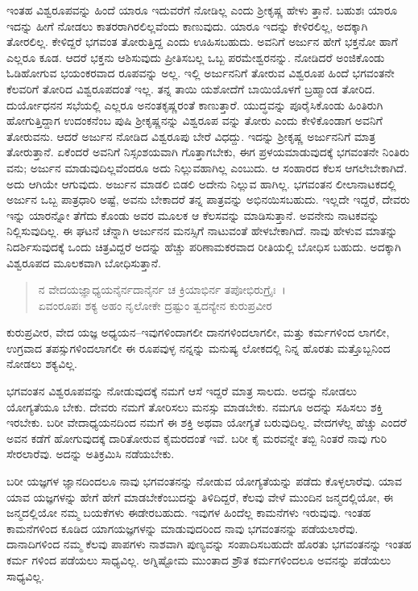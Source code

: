 ಇಂತಹ ವಿಶ್ವರೂಪವನ್ನು ಹಿಂದೆ ಯಾರೂ ಇದುವರೆಗೆ ನೋಡಿಲ್ಲ ಎಂದು ಶ‍್ರೀಕೃಷ್ಣ ಹೇಳು ತ್ತಾನೆ. ಬಹುಶಃ ಯಾರೂ ಇದನ್ನು ಹೀಗೆ ನೋಡಲು ಕಾತರರಾಗಿರಲಿಲ್ಲವೆಂದು ಕಾಣುವುದು. ಯಾರೂ ಇದನ್ನು ಕೇಳಿರಲಿಲ್ಲ, ಅದಕ್ಕಾಗಿ ತೋರಲಿಲ್ಲ. ಕೇಳಿದ್ದರೆ ಭಗವಂತ ತೋರುತ್ತಿದ್ದ ಎಂದು ಊಹಿಸಬಹುದು. ಅವನಿಗೆ ಅರ್ಜುನ ಹೇಗೆ ಭಕ್ತನೋ ಹಾಗೆ ಎಲ್ಲರೂ ಕೂಡ. ಆದರೆ ಭಕ್ತನು ಆಶಿಸುವುದು ಪ್ರೀತಿಸಬಲ್ಲ ಒಬ್ಬ ಪರಮೇಶ್ವರನನ್ನು. ನೋಡಿದರೆ ಅಂಜಿಕೊಂಡು ಓಡಿಹೋಗುವ ಭಯಂಕರವಾದ ರೂಪವನ್ನು ಅಲ್ಲ. ಇಲ್ಲಿ ಅರ್ಜುನನಿಗೆ ತೋರುವ ವಿಶ್ವರೂಪ ಹಿಂದೆ ಭಗವಂತನೇ ಕೆಲವರಿಗೆ ತೋರಿದ ವಿಶ್ವರೂಪದಂತೆ ಇಲ್ಲ. ತನ್ನ ತಾಯಿ ಯಶೋದೆಗೆ ಬಾಯಿಯೊಳಗೆ ಬ್ರಹ್ಮಾಂಡ ತೋರಿದ. ದುರ್ಯೋಧನನ ಸಭೆಯಲ್ಲಿ ಎಲ್ಲರೂ ಅನಂತಕೃಷ್ಣರಂತೆ ಕಾಣುತ್ತಾರೆ. ಯುದ್ಧವನ್ನು ಪೂರೈಸಿಕೊಂಡು ಹಿಂತಿರುಗಿ ಹೋಗುತ್ತಿದ್ದಾಗ ಉದಂಕನೆಂಬ ಪುಷಿ ಶ‍್ರೀಕೃಷ್ಣನನ್ನು ವಿಶ್ವರೂಪ ವನ್ನು ತೋರು ಎಂದು ಕೇಳಿಕೊಂಡಾಗ ಅವನಿಗೆ ತೋರುವನು. ಆದರೆ ಅರ್ಜುನ ನೋಡಿದ ವಿಶ್ವರೂಪು ಬೇರೆ ವಿಧದ್ದು. ಇದನ್ನು ಶ‍್ರೀಕೃಷ್ಣ ಅರ್ಜುನನಿಗೆ ಮಾತ್ರ ತೋರುತ್ತಾನೆ. ಏಕೆಂದರೆ ಅವನಿಗೆ ನಿಸ್ಸಂಶಯವಾಗಿ ಗೊತ್ತಾಗಬೇಕು, ಈಗ ಪ್ರಳಯಮಾಡುವುದಕ್ಕೆ ಭಗವಂತನೇ ನಿಂತಿರು ವನು; ಅರ್ಜುನ ಮಾಡುವುದಿಲ್ಲವೆಂದರೂ ಅದು ನಿಲ್ಲುವಹಾಗಿಲ್ಲ ಎಂಬುದು. ಆ ಸಂಹಾರದ ಕೆಲಸ ಆಗಲೇಬೇಕಾಗಿದೆ. ಅದು ಆಗಿಯೇ ಆಗುವುದು. ಅರ್ಜುನ ಮಾಡಲಿ ಬಿಡಲಿ ಅದೇನು ನಿಲ್ಲುವ ಹಾಗಿಲ್ಲ. ಭಗವಂತನ ಲೀಲಾನಾಟಕದಲ್ಲಿ ಅರ್ಜುನ ಒಬ್ಬ ಪಾತ್ರಧಾರಿ ಅಷ್ಟೆ, ಅವನು ಬೇಕಾದರೆ ತನ್ನ ಪಾತ್ರವನ್ನು ಅಭಿನಯಿಸಬಹುದು. ಇಲ್ಲದೇ ಇದ್ದರೆ, ದೇವರು ಇನ್ನು ಯಾರನ್ನೋ ತೆಗೆದು ಕೊಂಡು ಅವರ ಮೂಲಕ ಆ ಕೆಲಸವನ್ನು ಮಾಡಿಸುತ್ತಾನೆ. ಅವನೇನು ನಾಟಕವನ್ನು ನಿಲ್ಲಿಸುವುದಿಲ್ಲ. ಈ ಘಟನೆ ಚೆನ್ನಾಗಿ ಅರ್ಜುನನ ಮನಸ್ಸಿಗೆ ನಾಟುವಂತೆ ಹೇಳಬೇಕಾಗಿದೆ. ನಾವು ಹೇಳುವ ಮಾತನ್ನು ನಿದರ್ಶಿಸುವುದಕ್ಕೆ ಒಂದು ಚಿತ್ರವಿದ್ದರೆ ಅದನ್ನು ಹೆಚ್ಚು ಪರಿಣಾಮಕರವಾದ ರೀತಿಯಲ್ಲಿ ಬೋಧಿಸ ಬಹುದು. ಅದಕ್ಕಾಗಿ ವಿಶ್ವರೂಪದ ಮೂಲಕವಾಗಿ ಬೋಧಿಸುತ್ತಾನೆ.

\begin{verse}
ನ ವೇದಯಜ್ಞಾಧ್ಯಯನೈರ್ನದಾನೈರ್ನ ಚ ಕ್ರಿಯಾಭಿರ್ನ ತಪೋಭಿರುಗ್ರೈಃ~।\\ಏವಂರೂಪಃ ಶಕ್ಯ ಅಹಂ ನೃಲೋಕೇ ದ್ರಷ್ಟುಂ ತ್ವದನ್ಯೇನ ಕುರುಪ್ರವೀರ 
\end{verse}

{\small ಕುರುಪ್ರವೀರ, ವೇದ ಯಜ್ಞ ಅಧ್ಯಯನ–ಇವುಗಳಿಂದಾಗಲೀ ದಾನಗಳಿಂದಲಾಗಲೀ, ಮತ್ತು ಕರ್ಮಗಳಿಂದ ಲಾಗಲೀ, ಉಗ್ರವಾದ ತಪಸ್ಸುಗಳಿಂದಲಾಗಲೀ ಈ ರೂಪವುಳ್ಳ ನನ್ನನ್ನು ಮನುಷ್ಯ ಲೋಕದಲ್ಲಿ ನಿನ್ನ ಹೊರತು ಮತ್ತೊಬ್ಬನಿಂದ ನೋಡಲು ಶಕ್ಯವಿಲ್ಲ.}

ಭಗವಂತನ ವಿಶ್ವರೂಪವನ್ನು ನೋಡುವುದಕ್ಕೆ ನಮಗೆ ಆಸೆ ಇದ್ದರೆ ಮಾತ್ರ ಸಾಲದು. ಅದನ್ನು ನೋಡಲು ಯೋಗ್ಯತೆಯೂ ಬೇಕು. ದೇವರು ನಮಗೆ ತೋರಿಸಲು ಮನಸ್ಸು ಮಾಡಬೇಕು. ನಮಗೂ ಅದನ್ನು ಸಹಿಸಲು ಶಕ್ತಿ ಇರಬೇಕು. ಬರೀ ವೇದಾಧ್ಯಯನದಿಂದ ನಮಗೆ ಈ ಶಕ್ತಿ ಅಥವಾ ಯೋಗ್ಯತೆ ಬರುವುದಿಲ್ಲ. ವೇದಗಳೆಲ್ಲ ಹೆಚ್ಚು ಎಂದರೆ ಅವನ ಕಡೆಗೆ ಹೋಗುವುದಕ್ಕೆ ದಾರಿತೋರುವ ಕೈಮರದಂತೆ ಇವೆ. ಬರೀ ಕೈ ಮರವನ್ನೇ ತಬ್ಬಿ ನಿಂತರೆ ನಾವು ಗುರಿ ಸೇರಲಾರೆವು. ಅದನ್ನು ಅತಿಕ್ರಮಿಸಿ ನಡೆಯಬೇಕು.

ಬರೀ ಯಜ್ಞಗಳ ಜ್ಞಾನದಿಂದಲೂ ನಾವು ಭಗವಂತನನ್ನು ನೋಡುವ ಯೋಗ್ಯತೆಯನ್ನು ಪಡೆದು ಕೊಳ್ಳಲಾರೆವು. ಯಾವ ಯಾವ ಯಜ್ಞಗಳನ್ನು ಹೇಗೆ ಹೇಗೆ ಮಾಡಬೇಕೆಂಬುದನ್ನು ತಿಳಿದಿದ್ದರೆ, ಕೆಲವು ವೇಳೆ ಮುಂದಿನ ಜನ್ಮದಲ್ಲಿಯೋ, ಈ ಜನ್ಮದಲ್ಲಿಯೋ ನಮ್ಮ ಬಯಕೆಗಳು ಈಡೇರಬಹುದು. ಇವುಗಳ ಹಿಂದೆಲ್ಲ ಕಾಮನೆಗಳು ಇರುವುವು. ಇಂತಹ ಕಾಮನೆಗಳಿಂದ ಕೂಡಿದ ಯಾಗಯಜ್ಞಗಳನ್ನು ಮಾಡುವುದರಿಂದ ನಾವು ಭಗವಂತನನ್ನು ಪಡೆಯಲಾರೆವು. ದಾನಾದಿಗಳಿಂದ ನಮ್ಮ ಕೆಲವು ಪಾಪಗಳು ನಾಶವಾಗಿ ಪುಣ್ಯವನ್ನು ಸಂಪಾದಿಸಬಹುದೇ ಹೊರತು ಭಗವಂತನನ್ನು ಇಂತಹ ಕರ್ಮ ಗಳಿಂದ ಪಡೆಯಲು ಸಾಧ್ಯವಿಲ್ಲ. ಅಗ್ನಿಷ್ಟೋಮ ಮುಂತಾದ ಶ್ರೌತ ಕರ್ಮಗಳಿಂದಲೂ ಅವನನ್ನು ಪಡೆಯಲು ಸಾಧ್ಯವಿಲ್ಲ.

